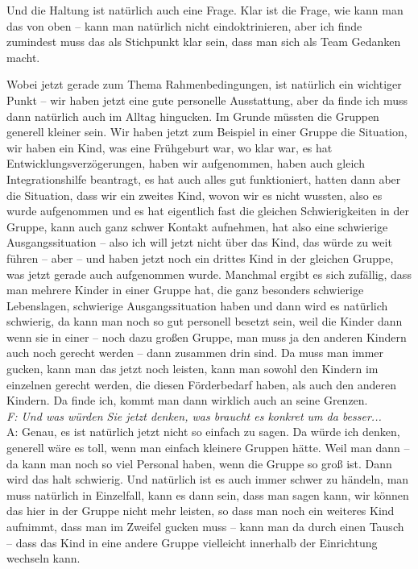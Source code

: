 \begin{linenumbers*}
Und die Haltung ist natürlich auch eine Frage. Klar ist die Frage, wie kann man das von oben – kann man natürlich nicht eindoktrinieren, aber ich finde zumindest muss das als Stichpunkt klar sein, dass man sich als Team Gedanken macht.  

Wobei jetzt gerade zum Thema Rahmenbedingungen, ist natürlich ein wichtiger Punkt – wir haben jetzt eine gute personelle Ausstattung, aber da finde ich muss dann natürlich auch im Alltag hingucken. Im Grunde müssten die Gruppen generell kleiner sein. Wir haben jetzt zum Beispiel in einer Gruppe die Situation, wir haben ein Kind, was eine Frühgeburt war, wo klar war, es hat Entwicklungsverzögerungen, haben wir aufgenommen, haben auch gleich Integrationshilfe beantragt, es hat auch alles gut funktioniert, hatten dann aber die Situation, dass wir ein zweites Kind, wovon wir es nicht wussten, also es wurde aufgenommen und es hat eigentlich fast die gleichen Schwierigkeiten in der Gruppe, kann auch ganz schwer Kontakt aufnehmen, hat also eine schwierige Ausgangssituation – also ich will jetzt nicht über das Kind, das würde zu weit führen -- aber -- und haben jetzt noch ein drittes Kind in der gleichen Gruppe, was jetzt gerade auch aufgenommen wurde. Manchmal ergibt es sich zufällig, dass man mehrere Kinder in einer Gruppe hat, die ganz besonders schwierige Lebenslagen, schwierige Ausgangssituation haben und dann wird es natürlich schwierig, da kann man noch so gut personell besetzt sein, weil die Kinder dann wenn sie in einer – noch dazu großen Gruppe, man muss ja den anderen Kindern auch noch gerecht werden – dann zusammen drin sind. Da muss man immer gucken, kann man das jetzt noch leisten, kann man sowohl den Kindern im einzelnen gerecht werden, die diesen Förderbedarf haben, als auch den anderen Kindern. Da finde ich, kommt man dann wirklich auch an seine Grenzen.\\
\emph{F: Und was würden Sie jetzt denken, was braucht es konkret um da besser...}\\
A: Genau, es ist natürlich jetzt nicht so einfach zu sagen. Da würde ich denken, generell wäre es toll, wenn man einfach kleinere Gruppen hätte. Weil man dann – da kann man noch so viel Personal haben, wenn die Gruppe so groß ist. Dann wird das halt schwierig. Und natürlich ist es auch immer schwer zu händeln, man muss natürlich in Einzelfall, kann es dann sein, dass man sagen kann, wir können das hier in der Gruppe nicht mehr leisten, so dass man noch ein weiteres Kind aufnimmt, dass man im Zweifel gucken muss – kann man da durch einen Tausch – dass das Kind in eine andere Gruppe vielleicht innerhalb der Einrichtung wechseln kann.  


\end{linenumbers*}
